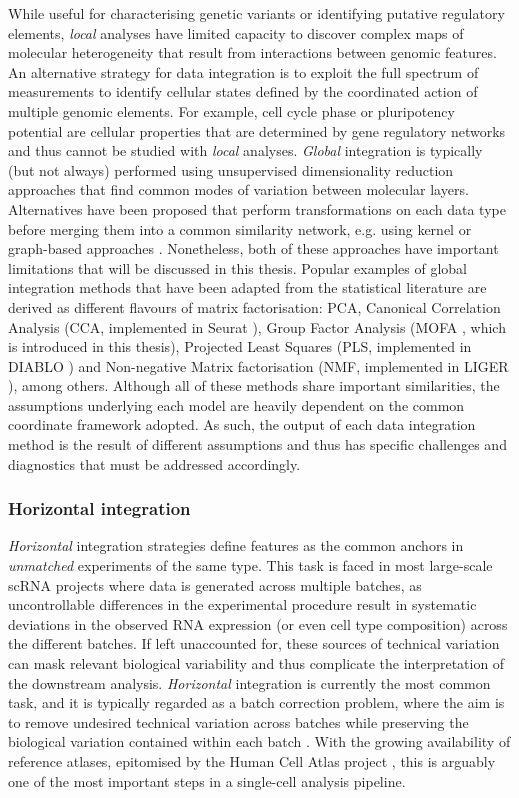 While useful for characterising genetic variants or identifying putative regulatory elements, \textit{local} analyses have limited capacity to discover complex maps of molecular heterogeneity that result from interactions between genomic features. An alternative strategy for data integration is to exploit the full spectrum of measurements to identify cellular states defined by the coordinated action of multiple genomic elements. For example, cell cycle phase or pluripotency potential are cellular properties that are determined by gene regulatory networks and thus cannot be studied with \textit{local} analyses. \textit{Global} integration is typically (but not always) performed using unsupervised dimensionality reduction approaches that find common modes of variation between molecular layers. Alternatives have been proposed that perform transformations on each data type before merging them into a common similarity network, e.g. using kernel or graph-based approaches \cite{Lanckriet2004, Wang2014}. Nonetheless, both of these approaches have important limitations that will be discussed in this thesis. Popular examples of global integration methods that have been adapted from the statistical literature are derived as different flavours of matrix factorisation: PCA, Canonical Correlation Analysis (CCA, implemented in Seurat \cite{Butler2018}), Group Factor Analysis (MOFA \cite{Argelaguet2018,Argelaguet2019}, which is introduced in this thesis), Projected Least Squares (PLS, implemented in DIABLO \cite{Singh2018}) and Non-negative Matrix factorisation (NMF, implemented in LIGER \cite{Welch2019}), among others. Although all of these methods share important similarities, the assumptions underlying each model are heavily dependent on the common coordinate framework adopted. As such, the output of each data integration method is the result of different assumptions and thus has specific challenges and diagnostics that must be addressed accordingly.

\subsubsection{Horizontal integration}

\textit{Horizontal} integration strategies define features as the common anchors in \textit{unmatched} experiments of the same type. This task is faced in most large-scale scRNA projects where data is generated across multiple batches, as uncontrollable differences in the experimental procedure result in systematic deviations in the observed RNA expression (or even cell type composition) across the different batches. If left unaccounted for, these sources of technical variation can mask relevant biological variability and thus complicate the interpretation of the downstream analysis. \textit{Horizontal} integration is currently the most common task, and it is typically regarded as a batch correction problem, where the aim is to remove undesired technical variation across batches while preserving the biological variation contained within each batch \cite{Tran2020}. With the growing availability of reference atlases, epitomised by the Human Cell Atlas project \cite{Aviv2017}, this is arguably one of the most important steps in a single-cell analysis pipeline. 

